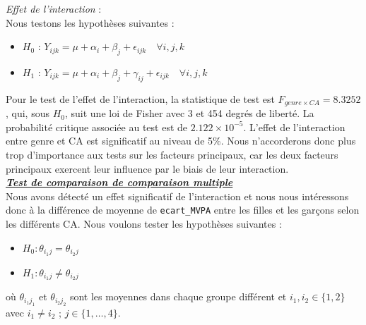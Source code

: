\documentclass[12pt,a4paper]{article}
\begin{document}
\begin{enumerate}[label=\textbf{\alph*})]
	\textit{Effet de l'interaction} : \\
	Nous testons les hypothèses suivantes :
	\begin{itemize}[label=--, leftmargin=*]
		\item \textbf{$H_0$} : $Y_{ijk} = \mu + \alpha_i + \beta_j + \epsilon_{ijk} \quad \forall i,j,k$ 
		\item \textbf{$H_1$} : $Y_{ijk} = \mu + \alpha_i + \beta_j + \gamma_{ij} + \epsilon_{ijk} \quad \forall i,j,k$
	\end{itemize}
	
	Pour le test de l'effet de l'interaction, la statistique de test est $F_{genre \times CA} = 8.3252$, qui, sous $H_0$, suit une loi de Fisher avec 3 et 454 degrés de liberté. La probabilité critique associée au test est de $2.122 \times 10^{-5}$. L'effet de l'interaction entre genre et CA est significatif au niveau de 5\%. Nous n'accorderons donc plus trop d'importance aux tests sur les facteurs principaux, car les deux facteurs principaux exercent leur influence par le biais de leur interaction.\\
	
	\noindent
	\textbf{\textit{\underline{Test de comparaison  de comparaison multiple}}} \\
	
	Nous avons détecté un effet significatif de l'interaction et nous nous intéressons donc à la différence de moyenne de \texttt{ecart\_MVPA} entre les filles et les garçons selon les différents CA. Nous voulons tester les hypothèses suivantes :	
	\begin{itemize}[label=--, leftmargin=*]
		\item $H_0 : \theta_{i_1j} = \theta_{i_2j}$
		\item $H_1 : \theta_{i_1j} \neq \theta_{i_2j}$
	\end{itemize}
	où $\theta_{i_1j_1}$ et $\theta_{i_2j_2}$ sont les moyennes dans chaque groupe différent et $i_1, i_2 \in \{1, 2\}$ avec $i_1 \neq i_2$ ; $j \in \{1, \ldots, 4\}$. \\
	

\end{enumerate}
\end{document}
